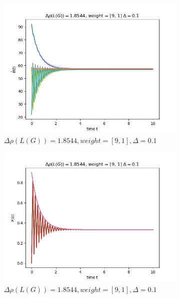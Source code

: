 \documentclass{article}
\begin{document}
\begin{problem}
\begin{figure}[!h]
\begin{subfigure}{0.4\textwidth}
            \includegraphics[width=\textwidth]{./img/Figure_16.png}
            \caption{$\Delta \rho (L(G)) = 1.8544, weight = [9,1], \Delta = 0.1$ }
        \end{subfigure}
        \begin{subfigure}{0.4\textwidth}
            \includegraphics[width=\textwidth]{./img/Figure_17.png}
            \caption{$\Delta \rho (L(G)) = 1.8544, weight = [9,1], \Delta = 0.1$ }
        \end{subfigure}
        \begin{subfigure}{0.4\textwidth}

\end{subfigure}
\end{figure}
\end{problem}
\end{document}
